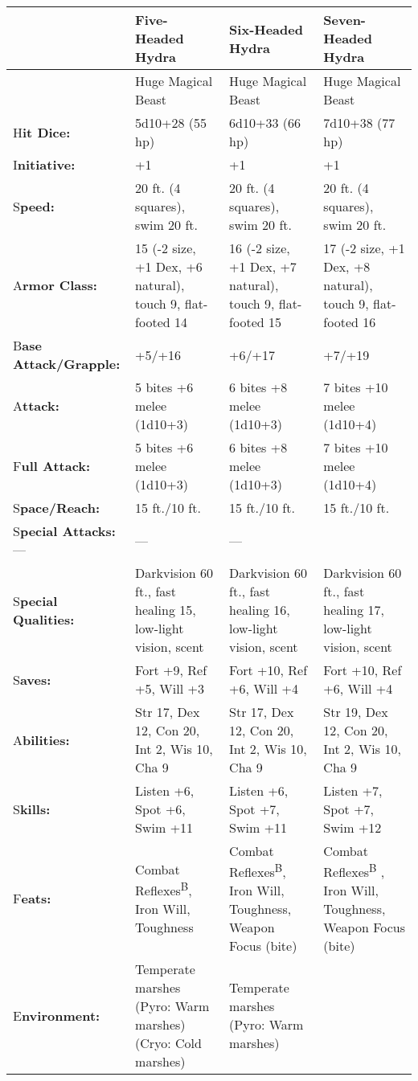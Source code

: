 \documentclass{article}
\begin{document}
\begin{tabular}{|>{\raggedright}p{52pt}|>{\raggedright}p{83pt}|>{\raggedright}p{83pt}|>{\raggedright}p{83pt}|}
\hline
  & F\textbf{ive-Headed Hydra} & S\textbf{ix-Headed Hydra} & S\textbf{even-Headed 
Hydra}\tabularnewline
\hline
  & Huge Magical Beast & Huge Magical Beast & Huge Magical Beast\tabularnewline
\hline
H\textbf{it Dice:} & 5d10+28 (55 hp) & 6d10+33 (66 hp) & 7d10+38 (77 hp)\tabularnewline
\hline
I\textbf{nitiative:} & +1 & +1 & +1\tabularnewline
\hline
S\textbf{peed:} & 20 ft. (4 squares), swim 20 ft. & 20 ft. (4 squares), swim 20 
ft. & 20 ft. (4 squares), swim 20 ft.\tabularnewline
\hline
A\textbf{rmor Class:} & 15 (-2 size, +1 Dex, +6 natural), touch 9, flat-footed 
14 & 16 (-2 size, +1 Dex, +7 natural), touch 9, flat-footed 15 & 17 (-2 size, +1 
Dex, +8 natural), touch 9, flat-footed 16\tabularnewline
\hline
B\textbf{ase Attack/Grapple:} & +5/+16 & +6/+17 & +7/+19\tabularnewline
\hline
A\textbf{ttack:} & 5 bites +6 melee (1d10+3) & 6 bites +8 melee (1d10+3) & 7 bites 
+10 melee (1d10+4)\tabularnewline
\hline
F\textbf{ull Attack:} & 5 bites +6 melee (1d10+3) & 6 bites +8 melee (1d10+3) & 7 
bites +10 melee (1d10+4)\tabularnewline
\hline
S\textbf{pace/Reach:} & 15 ft./10 ft. & 15 ft./10 ft. & 15 ft./10 ft.\tabularnewline
\hline
S\textbf{pecial Attacks:}--- & --- & --- & \tabularnewline
\hline
S\textbf{pecial Qualities:} & Darkvision 60 ft., fast healing 15, low-light vision, 
scent & Darkvision 60 ft., fast healing 16, low-light vision, scent & Darkvision 
60 ft., fast healing 17, low-light vision, scent\tabularnewline
\hline
S\textbf{aves:} & Fort +9, Ref +5, Will +3 & Fort +10, Ref +6, Will +4 & Fort +10, 
Ref +6, Will +4\tabularnewline
\hline
A\textbf{bilities:} & Str 17, Dex 12, Con 20, Int 2, Wis 10, Cha 9 & Str 17, Dex 
12, Con 20, Int 2, Wis 10, Cha 9 & Str 19, Dex 12, Con 20, Int 2, Wis 10, Cha 9\tabularnewline
\hline
S\textbf{kills:} & Listen +6, Spot +6, Swim +11 & Listen +6, Spot +7, Swim +11 & Listen 
+7, Spot +7, Swim +12\tabularnewline
\hline
F\textbf{eats:} & Combat Reflexes\textsuperscript{B}, Iron Will, Toughness & Combat 
Reflexes\textsuperscript{B}, Iron Will, Toughness, Weapon Focus (bite) & Combat 
Reflexes\textsuperscript{B}{\scriptsize{} }, Iron Will, Toughness, Weapon Focus 
(bite)\tabularnewline
\hline
E\textbf{nvironment:} & Temperate marshes\linebreak{}
(Pyro: Warm marshes) \linebreak{}
(Cryo: Cold marshes) & Temperate marshes \linebreak{}
(Pyro: Warm marshes) \linebreak{}

\end{tabular}
\end{document}
